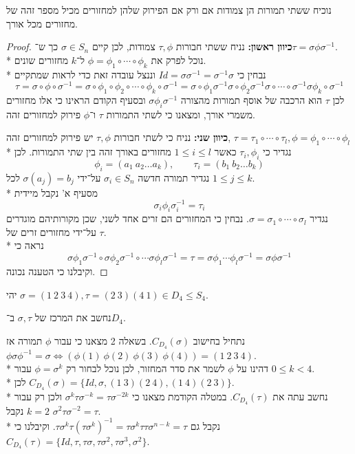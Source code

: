 \Subquestion{}
נוכיח ששתי תמורות הן צמודות אם ורק אם הפירוק שלהן למחזורים מכיל מספר זהה של מחזורים מכל אורך.
\begin{proof}
	\textbf{כיוון ראשון:}
	נניח ששתי חבורות $\tau, \phi$ צמודות, לכן קיים $\sigma \in S_n$ כך ש־$\tau = \sigma \phi \sigma^{-1}$. \\*
	נוכל לפרק את $\phi = \phi_1\circ\cdots \circ \phi_k$ ל־$k$ מחזורים שונים. \\*
	נבחין כי $Id = \sigma \sigma^{-1} = \sigma^{-1} \sigma$ וננצל עובדה זאת כדי לראות שמתקיים
	\[
		\tau
		= \sigma \circ \phi \circ \sigma^{-1}
		= \sigma \circ \phi_1 \circ \phi_2 \circ \cdots \circ \phi_k \circ \sigma^{-1}
		= \sigma \circ \phi_1 \sigma^{-1} \sigma \circ \phi_2\sigma^{-1} \sigma \circ \cdots \circ \sigma^{-1} \sigma\phi_k \circ \sigma^{-1}
	\]
	לכן $\tau$ הוא הרכבה של אוסף תמורות מהצורה $\sigma \phi_i \sigma^{-1}$ ובסעיף הקודם הראינו כי אלו מחזורים משמרי אורך, ומצאנו כי לשתי התמורות $\tau$ ו־$\phi$ פירוק למחזורים זהה.

	\textbf{כיוון שני:}
	נניח כי לשתי חבורות $\tau, \phi$ יש פירוק למחזורים זהה, $\tau = \tau_1 \circ \cdots \circ \tau_l, \phi = \phi_1 \circ \cdots \circ \phi_l$ \\*
	נגדיר כי $\tau_i, \phi_i$ כאשר $1 \le i \le l$ מחזורים באורך זהה בין שתי התמורות. לכן
	\[
		\phi_i = (a_1\ a_2 \dots a_k), \qquad
		\tau_i = (b_1\ b_2 \dots b_k)
	\]
	נגדיר תמורה חדשה $\sigma_i \in S_n$ על־ידי $\sigma(a_j) = b_j$ לכל $1 \le j \le k$. \\*
	מסעיף א' נקבל מיידית
	\[
		\sigma_i \phi_i \sigma_i^{-1} = \tau_i
	\]
	נגדיר $\sigma = \sigma_1 \circ \cdots \circ \sigma_l$. נבחין כי המחזורים הם זרים אחד לשני, שכן מקורותיהם מוגדרים על־ידי מחזורים זרים של $\tau$. \\*
	נראה כי
	\[
		\sigma \phi_1 \sigma^{-1} \circ
		\sigma \phi_2 \sigma^{-1} \circ
		\cdots
		\sigma \phi_l \sigma^{-1}
		= \tau
		= \sigma \phi_1 \cdots \phi_l \sigma^{-1}
		= \sigma \phi \sigma^{-1}
	\]
	וקיבלנו כי הטענה נכונה.
\end{proof}

\Question{}
יהי $\sigma = (1\ 2\ 3\ 4), \tau = (2\ 3)(4\ 1) \in D_4 \le S_4$.

\Subquestion{}
נחשב את המרכז של $\sigma, \tau$ ב־$D_4$.

נתחיל בחישוב $C_{D_4}(\sigma)$. בשאלה 2 מצאנו כי עבור $\phi$ תמורה אז $\phi \sigma \phi^{-1} = \sigma \iff (\phi(1)\ \phi(2)\ \phi(3)\ \phi(4)) = (1\ 2\ 3\ 4)$. \\*
דהינו על $\phi$ לשמר את סדר המחזור, לכן נוכל לבחור רק $\phi = \sigma^k$ עבור $0 \le k < 4$. \\*
לכן $C_{D_4}(\sigma) = \{ Id, \sigma, (1\ 3)(2\ 4), (1\ 4)(2\ 3) \}$. \\*
נחשב עתה את $C_{D_4}(\tau)$. במטלה הקודמת מצאנו כי $\sigma^k \tau \sigma^{-k} = \tau \sigma^{-2k}$ ולכן רק עבור $k = 2$ נקבל $\sigma^2 \tau \sigma^{-2} = \tau$. \\*
נקבל גם $\tau \sigma^k \tau {(\tau \sigma^k)}^{-1} = \tau \sigma^k \tau \tau \sigma^{n - k} = \tau$.
וקיבלנו כי $C_{D_4}(\tau) = \{ Id, \tau, \tau \sigma, \tau \sigma^2, \tau \sigma^3, \sigma^2\}$.

